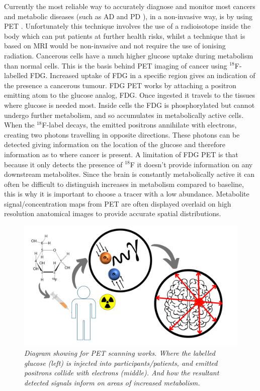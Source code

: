Currently the most reliable way to accurately diagnose and monitor most cancers and metabolic diseases (such as \ac{AD} \cite{Shokouhi2014ImagingTomography} and \ac{PD} \cite{Meles2017MetabolicDisease}), in a non-invasive way, is by using \ac{PET} \cite{Almuhaideb201118F-FDGOncology}. Unfortunately this technique involves the use of a radioisotope inside the body which can put patients at further health risks, whilst a technique that is based on \ac{MRI} would be non-invasive and not require the use of ionising radiation. Cancerous cells have a much higher glucose uptake during metabolism than normal cells. This is the basis behind \ac{PET} imaging of cancer using $^{18}$F-labelled \ac{FDG}. Increased uptake of \ac{FDG} in a specific region gives an indication of the presence a cancerous tumour. \ac{FDG} \ac{PET} works by attaching a positron emitting atom to the glucose analog, \ac{FDG}. Once ingested it travels to the tissues where glucose is needed most. Inside cells the \ac{FDG} is phosphorylated but cannot undergo further metabolism, and so accumulates in metabolically active cells. When the $^{18}$F-label decays, the emitted positrons annihilate with electrons, creating two photons travelling in opposite directions. These photons can be detected giving information on the location of the glucose and therefore information as to where cancer is present. A limitation of \ac{FDG} \ac{PET} is that because it only detects the presence of $^{18}$F it doesn't provide information on any downstream metabolites. Since the brain is constantly metabolically active it can often be difficult to distinguish increases in metabolism compared to baseline, this is why it is important to choose a tracer with a low abundance. Metabolite signal/concentration maps from \ac{PET} are often displayed overlaid on high resolution anatomical images to provide accurate spatial distributions.

\begin{figure}
    \centering
    \includegraphics[width=1\textwidth]{Figures/Intro/PET_Scan.png}
    \caption{\textit{Diagram showing for \ac{PET} scanning works. Where the labelled glucose (left) is injected into participants/patients, and emitted positrons collide with electrons (middle). And how the resultant detected signals inform on areas of increased metabolism.}}
    \label{fig:intro:PET}
\end{figure}

